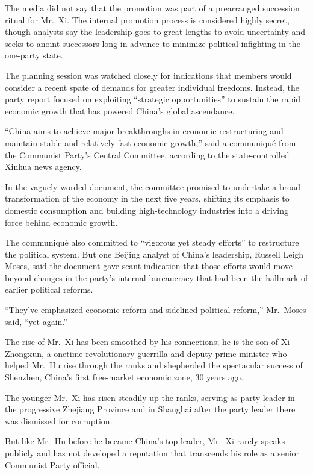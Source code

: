 ﻿\documentclass[12pt]{article}
\begin{document}
The media did not say that the promotion was part of a prearranged succession ritual for Mr.~Xi. The
internal promotion process is considered highly secret, though analysts say the leadership goes to
great lengths to avoid uncertainty and seeks to anoint successors long in advance to minimize
political infighting in the one-party state.

The planning session was watched closely for indications that members would consider a recent spate
of demands for greater individual freedoms. Instead, the party report focused on exploiting
``strategic opportunities'' to sustain the rapid economic growth that has powered China's global
ascendance.

``China aims to achieve major breakthroughs in economic restructuring and maintain stable and
relatively fast economic growth,'' said a communiqu\'e from the Communist Party's Central Committee,
according to the state-controlled Xinhua news agency.

In the vaguely worded document, the committee promised to undertake a broad transformation of the
economy in the next five years, shifting its emphasis to domestic consumption and building
high-technology industries into a driving force behind economic growth.

The communiqu\'e also committed to ``vigorous yet steady efforts'' to restructure the political
system. But one Beijing analyst of China's leadership, Russell Leigh Moses, said the document gave
scant indication that those efforts would move beyond changes in the party's internal bureaucracy
that had been the hallmark of earlier political reforms.

``They've emphasized economic reform and sidelined political reform,'' Mr.~Moses said, ``yet
again.''

The rise of Mr.~Xi has been smoothed by his connections; he is the son of Xi Zhongxun, a onetime
revolutionary guerrilla and deputy prime minister who helped Mr.~Hu rise through the ranks and
shepherded the spectacular success of Shenzhen, China's first free-market economic zone, 30 years
ago.

The younger Mr.~Xi has risen steadily up the ranks, serving as party leader in the progressive
Zhejiang Province and in Shanghai after the party leader there was dismissed for corruption.

But like Mr.~Hu before he became China's top leader, Mr.~Xi rarely speaks publicly and has not
developed a reputation that transcends his role as a senior Communist Party official.
\end{document}
